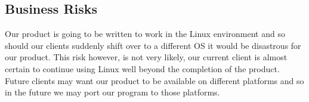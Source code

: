 \subsection{Business Risks}
Our product is going to be written to work in the Linux environment and so should our clients suddenly shift over to a different OS it would be disastrous for our product. This risk however, is not very likely, our current client is almost certain to continue using Linux well beyond the completion of the product. Future clients may want our product to be available on different platforms and so in the future we may port our program to those platforms.

